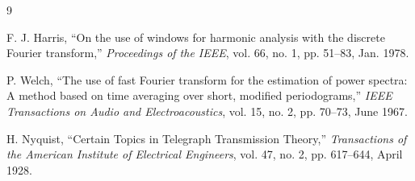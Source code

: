 \documentclass[10pt,a4paper]{article}
\begin{document}
	
	\begin{thebibliography}{9}
		
		F. J. Harris,
		``On the use of windows for harmonic analysis with the discrete Fourier transform,''
		\textit{Proceedings of the IEEE},
		vol. 66,
		no. 1,
		pp. 51--83,
		Jan. 1978.
		
		P. Welch,
		``The use of fast Fourier transform for the estimation of power spectra: A method based on time averaging over short, modified periodograms,''
		\textit{IEEE Transactions on Audio and Electroacoustics},
		vol. 15,
		no. 2,
		pp. 70--73,
		June 1967.
		
		H. Nyquist,
		``Certain Topics in Telegraph Transmission Theory,''
		\textit{Transactions of the American Institute of Electrical Engineers},
		vol. 47,
		no. 2,
		pp. 617--644,
		April 1928.
		
	\end{thebibliography}
	
\end{document}
